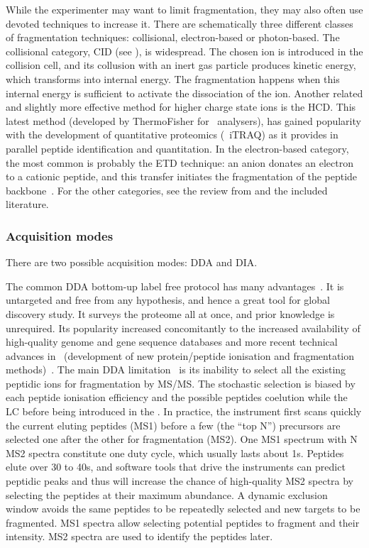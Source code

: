 While the experimenter may want to limit fragmentation,
they may also often use devoted techniques to increase it.
There are schematically three different classes of fragmentation techniques:
collisional, electron-based or photon-based.
The collisional category, \gls{CID} (see ),
is widespread.
The chosen ion is introduced in the collision cell,
and its collusion with an inert gas particle produces kinetic energy,
which transforms into internal energy.
The fragmentation happens when this internal energy is sufficient to activate
the dissociation of the ion.
Another related and slightly more effective method
for higher charge state ions is the \acrfull{HCD}.
This latest method (developed by ThermoFisher for \orbi\ analysers),
has gained popularity with the development of quantitative proteomics
(\eg\ \gls{iTRAQ})
as it provides in parallel peptide identification and quantitation.
In the electron-based category,
the most common is probably the \acrfull{ETD} technique:
an anion donates an electron to a cationic peptide,
and this transfer initiates
the fragmentation of the peptide backbone~.
For the other categories,
see the review from \citet{Zhang2014} and the included literature.\mybr\

\subsubsection{Acquisition modes}\label{subsub:msAcquisitionMode}
There are two possible acquisition modes: \gls{DDA} and \gls{DIA}.\mybr\

The common \gls{DDA} bottom-up label free protocol
has many advantages~.
It is untargeted and free from any hypothesis,
and hence a great tool for global discovery study.
It surveys the proteome all at once,
and prior knowledge is unrequired.
Its popularity increased concomitantly to the increased availability of
high-quality genome and gene sequence databases
and more recent technical advances in \ms\
(development of new protein/peptide ionisation
and fragmentation methods)~.
The main \gls{DDA} limitation~\mycite{Guillaumot2017-ba} is its inability
to select all the existing peptidic ions for fragmentation by \gls{MS/MS}.
The stochastic selection is biased by
each peptide ionisation efficiency
and the possible peptides coelution
while the \gls{LC} before being introduced in the \ms.
In practice, the instrument first scans quickly the current eluting peptides (MS1)
before a few (the ``top N'') precursors are selected
one after the other for fragmentation (MS2).
One MS1 spectrum with N MS2 spectra constitute one duty cycle,
which usually lasts about 1s.
Peptides elute over 30 to 40s,
and software tools that drive the instruments can predict peptidic peaks
and thus will increase the chance of high-quality MS2 spectra
by selecting the peptides at their maximum abundance.
A dynamic exclusion window avoids the same peptides to be repeatedly selected and
new targets to be fragmented.
MS1 spectra allow selecting potential peptides to fragment and their intensity.
MS2 spectra are used to identify the peptides later.\mybr\

